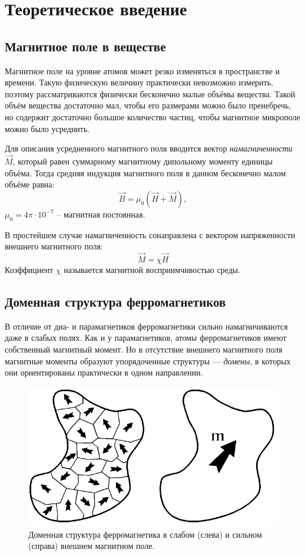 
\section*{Теоретическое введение}
\subsection*{Магнитное поле в веществе}

Магнитное поле на уровне атомов может резко изменяться в пространстве и времени. Такую физическую величину практически невозможно измерить, поэтому рассматриваются физически бесконечно малые объёмы вещества. Такой объём вещества достаточно мал, чтобы его размерами можно было пренебречь, но содержит достаточно большое количество частиц, чтобы магнитное микрополе можно было усреднить.

Для описания усредненного магнитного поля вводится вектор \textit{намагниченности} $\vec{M}$, который равен суммарному магнитному дипольному моменту единицы объёма. Тогда средняя индукция магнитного поля в данном бесконечно малом объёме равна:
$$
\vec{B} = \mu_0 (\vec{H} + \vec{M}),
$$
$\mu_0 = 4 \pi \cdot 10^{-7}$ -- магнитная постоянная.

В простейшем случае намагниченность сонаправлена с вектором напряженности внешнего магнитного поля:
$$
\vec{M} = \chi \vec{H}
$$
Коэффициент $\chi$ называется магнитной восприимчивостью среды.

\subsection*{Доменная структура ферромагнетиков}

В отличие от диа- и парамагнетиков ферромагнетики сильно намагничиваются даже в слабых полях. Как и у парамагнетиков, атомы ферромагнетиков имеют собственный магнитный момент. Но в отсутствие внешнего магнитного поля магнитные моменты образуют упорядоченные структуры --- \textit{домены}, в которых они ориентированы практически в одном направлении.

\begin{figure}
	\vspace{-10pt}
	\centering
	\includegraphics[width=0.70\linewidth]{../res/domens.png}
	\caption{Доменная структура ферромагнетика в слабом (слева) и сильном (справа) внешнем магнитном поле.}
	\label{img:domen}
\end{figure}

